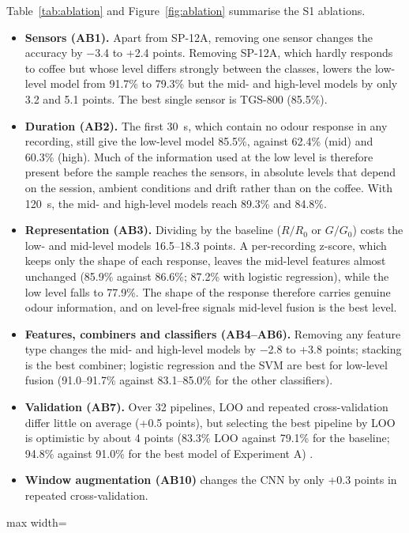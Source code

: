 \documentclass[12pt]{article}
\begin{document}
Table~\ref{tab:ablation} and Figure~\ref{fig:ablation} summarise the S1 ablations.
\begin{itemize}
\item \textbf{Sensors (AB1).} Apart from SP-12A, removing one sensor changes the accuracy by $-$3.4 to +2.4 points. Removing SP-12A, which hardly responds to coffee but whose level differs strongly between the classes, lowers the low-level model from 91.7\% to 79.3\% but the mid- and high-level models by only 3.2 and 5.1 points. The best single sensor is TGS-800 (85.5\%).
\item \textbf{Duration (AB2).} The first 30~s, which contain no odour response in any recording, still give the low-level model 85.5\%, against 62.4\% (mid) and 60.3\% (high). Much of the information used at the low level is therefore present before the sample reaches the sensors, in absolute levels that depend on the session, ambient conditions and drift \cite{vergara2012chemical} rather than on the coffee. With 120~s, the mid- and high-level models reach 89.3\% and 84.8\%.
\item \textbf{Representation (AB3).} Dividing by the baseline ($R/R_0$ or $G/G_0$) costs the low- and mid-level models 16.5--18.3 points. A per-recording z-score, which keeps only the shape of each response, leaves the mid-level features almost unchanged (85.9\% against 86.6\%; 87.2\% with logistic regression), while the low level falls to 77.9\%. The shape of the response therefore carries genuine odour information, and on level-free signals mid-level fusion is the best level.
\item \textbf{Features, combiners and classifiers (AB4--AB6).} Removing any feature type changes the mid- and high-level models by $-$2.8 to +3.8 points; stacking is the best combiner; logistic regression and the SVM are best for low-level fusion (91.0--91.7\% against 83.1--85.0\% for the other classifiers).
\item \textbf{Validation (AB7).} Over 32 pipelines, LOO and repeated cross-validation differ little on average (+0.5 points), but selecting the best pipeline by LOO is optimistic by about 4 points (83.3\% LOO against 79.1\% for the baseline; 94.8\% against 91.0\% for the best model of Experiment A) \cite{varma2006bias,cawley2010overfitting}.
\item \textbf{Window augmentation (AB10)} changes the CNN by only +0.3 points in repeated cross-validation.
\end{itemize}

\begin{table}[!htbp]
\centering
\caption[S1 ablations: accuracy of the reference model of each level]{S1 ablations: accuracy (\%) of the reference model of each fusion level (five repeats of five-fold cross-validation).}
\label{tab:ablation}
\footnotesize
\begin{adjustbox}{max width=\textwidth}

\end{adjustbox}
\end{table}
\end{document}
